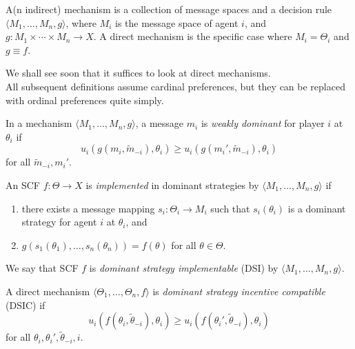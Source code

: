 \begin{fdef}
	A(n indirect) mechanism is a collection of message spaces and a decision rule $\langle M_1,\ldots,M_n,g\rangle$, where $M_i$ is the message space of agent $i$, and $g : M_1 \times \cdots \times M_n \to X$. A direct mechanism is the specific case where $M_i = \Theta_i$ and $g \equiv f$.
\end{fdef}

We shall see soon that it suffices to look at direct mechanisms.\\
All subsequent definitions assume cardinal preferences, but they can be replaced with ordinal preferences quite simply.

\begin{fdef}
	In a mechanism $\langle M_1,\ldots,M_n,g\rangle$, a message $m_i$ is \emph{weakly dominant} for player $i$ at $\theta_i$ if
	\begin{equation}
		\label{eqn: weakly dominant}
		u_i(g(m_i,\widetilde{m}_{-i}),\theta_i) \ge u_i(g(m_i',\widetilde{m}_{-i}),\theta_i)
	\end{equation}
	for all $\widetilde{m}_{-i},m_i'$.
\end{fdef}

\begin{fdef}
	 An SCF $f : \Theta \to X$ is \emph{implemented} in dominant strategies by $\langle M_1,\ldots,M_n,g\rangle$ if
	 \begin{enumerate}
	 	\item there exists a message mapping $s_i : \Theta_i \to M_i$ such that $s_i(\theta_i)$ is a dominant strategy for agent $i$ at $\theta_i$, and
	 	\item $g(s_1(\theta_1),\ldots,s_n(\theta_n)) = f(\theta)$ for all $\theta \in \Theta$.
	 \end{enumerate}
	We say that SCF $f$ is \emph{dominant strategy implementable} (DSI) by $\langle M_1,\ldots,M_n,g\rangle$.
\end{fdef}

\begin{fdef}
	\label{def: dsic}
	A direct mechanism $\langle \Theta_1,\ldots,\Theta_n,f\rangle$ is \emph{dominant strategy incentive compatible} (DSIC) if
	\begin{equation}
		\label{eqn: dsic}
		u_i(f(\theta_i,\widetilde{\theta}_{-i}),\theta_i) \ge u_i(f(\theta_i',\widetilde{\theta}_{-i}),\theta_i)
	\end{equation}
	for all $\theta_i,\theta_i',\widetilde{\theta}_{-i},i$.
\end{fdef}


